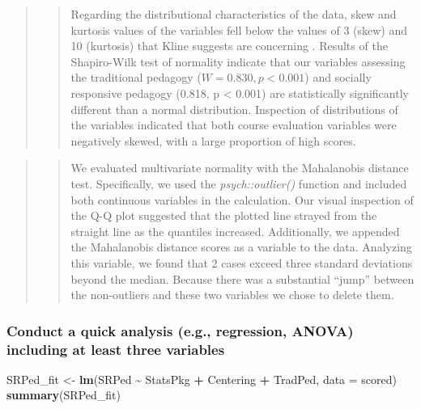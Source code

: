 \documentclass[
  11pt,
]{book}
\newenvironment{Shaded}{\begin{snugshade}}{\end{snugshade}}
\newcommand{\AttributeTok}[1]{\textcolor[rgb]{0.27,0.27,0.27}{#1}}
\newcommand{\FunctionTok}[1]{\textcolor[rgb]{0.27,0.27,0.27}{\textbf{#1}}}
\newcommand{\NormalTok}[1]{#1}
\newcommand{\OtherTok}[1]{\textcolor[rgb]{0.37,0.37,0.37}{#1}}
\newcommand{\SpecialCharTok}[1]{\textcolor[rgb]{0.43,0.43,0.43}{\textbf{#1}}}
\begin{document}
\begin{quote}
\begin{quote}
Regarding the distributional characteristics of the data, skew and kurtosis values of the variables fell below the values of 3 (skew) and 10 (kurtosis) that Kline suggests are concerning \citeyearpar{kline_principles_2016}. Results of the Shapiro-Wilk test of normality indicate that our variables assessing the traditional pedagogy (\(W = 0.830, p < 0.001\)) and socially responsive pedagogy (0.818, p \textless{} 0.001) are statistically significantly different than a normal distribution. Inspection of distributions of the variables indicated that both course evaluation variables were negatively skewed, with a large proportion of high scores.
\end{quote}
\end{quote}

\begin{quote}
\begin{quote}
We evaluated multivariate normality with the Mahalanobis distance test. Specifically, we used the \emph{psych::outlier()} function and included both continuous variables in the calculation. Our visual inspection of the Q-Q plot suggested that the plotted line strayed from the straight line as the quantiles increased. Additionally, we appended the Mahalanobis distance scores as a variable to the data. Analyzing this variable, we found that 2 cases exceed three standard deviations beyond the median. Because there was a substantial ``jump'' between the non-outliers and these two variables we chose to delete them.
\end{quote}
\end{quote}

\hypertarget{conduct-a-quick-analysis-e.g.-regression-anova-including-at-least-three-variables}{%
\subsubsection*{Conduct a quick analysis (e.g., regression, ANOVA) including at least three variables}\label{conduct-a-quick-analysis-e.g.-regression-anova-including-at-least-three-variables}}


\begin{Shaded}
\begin{Highlighting}[]
\NormalTok{SRPed\_fit }\OtherTok{\textless{}{-}} \FunctionTok{lm}\NormalTok{(SRPed }\SpecialCharTok{\textasciitilde{}}\NormalTok{ StatsPkg }\SpecialCharTok{+}\NormalTok{ Centering }\SpecialCharTok{+}\NormalTok{ TradPed, }\AttributeTok{data =}\NormalTok{ scored)}
\FunctionTok{summary}\NormalTok{(SRPed\_fit)}
\end{Highlighting}
\end{Shaded}
\end{document}
